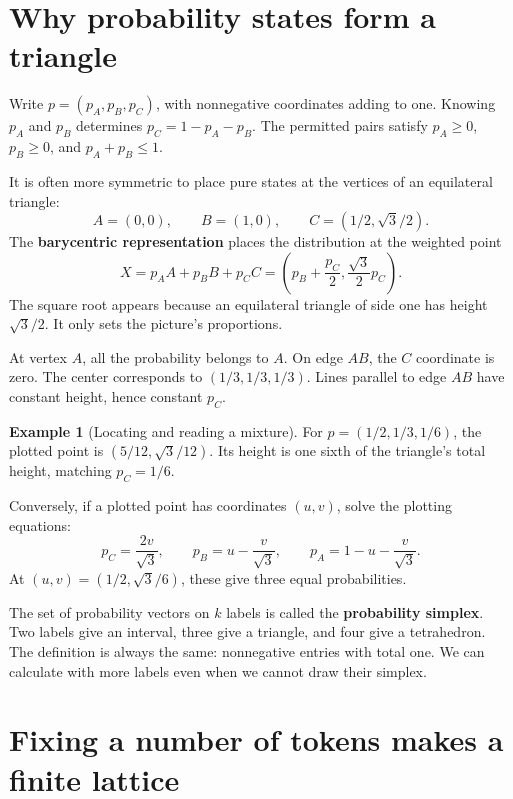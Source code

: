 \documentclass[11pt,oneside,openany]{book}
\theoremstyle{definition}
\newtheorem{example}{Example}[chapter]
\theoremstyle{remark}
\numberwithin{equation}{chapter}
\begin{document}
\section{Why probability states form a triangle}\label{ch03-why-probability-states-form-a-triangle}

Write \(p=(p_A,p_B,p_C)\), with nonnegative coordinates adding to one. Knowing \(p_A\) and \(p_B\) determines \(p_C=1-p_A-p_B\). The permitted pairs satisfy \(p_A\geq0\), \(p_B\geq0\), and \(p_A+p_B\leq1\).

It is often more symmetric to place pure states at the vertices of an equilateral triangle: \[A=(0,0),\qquad B=(1,0),\qquad C=(1/2,\sqrt3/2).\] The \textbf{barycentric representation} places the distribution at the weighted point \[X=p_AA+p_BB+p_CC
=\left(p_B+\frac{p_C}{2},\frac{\sqrt3}{2}p_C\right).\] The square root appears because an equilateral triangle of side one has height \(\sqrt3/2\). It only sets the picture's proportions.

At vertex \(A\), all the probability belongs to \(A\). On edge \(AB\), the \(C\) coordinate is zero. The center corresponds to \((1/3,1/3,1/3)\). Lines parallel to edge \(AB\) have constant height, hence constant \(p_C\).

\begin{example}[Locating and reading a mixture]

For \(p=(1/2,1/3,1/6)\), the plotted point is \((5/12,\sqrt3/12)\). Its height is one sixth of the triangle's total height, matching \(p_C=1/6\).

Conversely, if a plotted point has coordinates \((u,v)\), solve the plotting equations: \[p_C=\frac{2v}{\sqrt3},\qquad
p_B=u-\frac{v}{\sqrt3},\qquad
p_A=1-u-\frac{v}{\sqrt3}.\] At \((u,v)=(1/2,\sqrt3/6)\), these give three equal probabilities.

\end{example}

The set of probability vectors on \(k\) labels is called the \textbf{probability simplex}. Two labels give an interval, three give a triangle, and four give a tetrahedron. The definition is always the same: nonnegative entries with total one. We can calculate with more labels even when we cannot draw their simplex.

\section{Fixing a number of tokens makes a finite lattice}\label{ch03-fixing-a-number-of-tokens-makes-a-finite-lattice}
\end{document}
